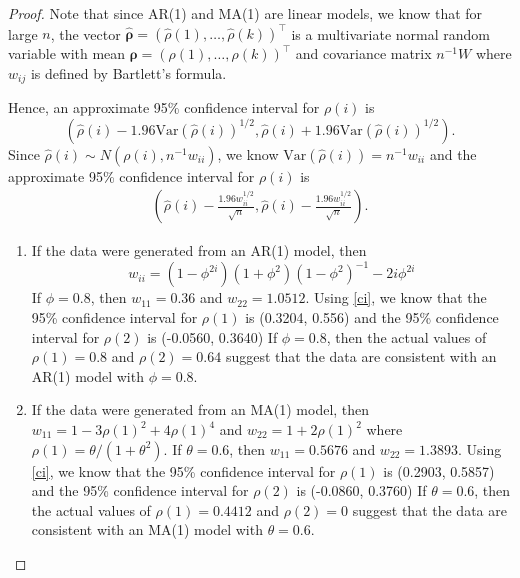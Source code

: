 \documentclass[12pt]{article}
\theoremstyle{definition}
\newcommand{\V}{\text{Var}}
\newcommand{\vect}[1]{\boldsymbol{#1}}
\begin{document}
\begin{proof}
  Note that since AR(1) and MA(1) are linear models, we know that for large $n$,
  the vector $\vect{\hat{\rho}} = (\hat{\rho}(1), \dots, \hat{\rho}(k))^\intercal$
  is a multivariate normal random variable with mean $\vect{\rho} = (\rho(1), \dots, \rho(k))^\intercal$
  and covariance matrix $n^{-1}W$ where $w_{ij}$ is defined by Bartlett's formula.

  Hence, an approximate 95\% confidence interval for
  $\rho(i)$ is
  \[
    \left(\hat{\rho}(i) - 1.96\V(\hat{\rho}(i))^{1/2}, \hat{\rho}(i) + 1.96\V(\hat{\rho}(i))^{1/2}\right).
  \]
  Since $\hat{\rho}(i) \sim N(\rho(i), n^{-1}w_{ii})$, we know $\V(\hat{\rho}(i)) = n^{-1}w_{ii}$ and the
  approximate 95\% confidence interval for $\rho(i)$ is
  \begin{align}\label{ci}
    \left(\hat{\rho}(i) - \frac{1.96w_{ii}^{1/2}}{\sqrt{n}}, \hat{\rho}(i) - \frac{1.96w_{ii}^{1/2}}{\sqrt{n}}\right).
  \end{align}
  \begin{enumerate}
    \item If the data were generated from an AR(1) model,
      then $$w_{ii} = (1 - \phi^{2i})(1 + \phi^2)(1 - \phi^2)^{-1} - 2i\phi^{2i}$$
      If $\phi = 0.8$, then $w_{11} = 0.36$ and $w_{22} = 1.0512$. Using \eqref{ci}, we know
      that the 95\% confidence interval for $\rho(1)$ is (0.3204, 0.556) and
      the 95\% confidence interval for $\rho(2)$ is (-0.0560, 0.3640)
      If $\phi = 0.8$, then the actual values of $\rho(1) = 0.8$ and $\rho(2) = 0.64$
      suggest that the data are consistent with an AR(1) model with
      $\phi = 0.8.$
    \item If the data were generated from an MA(1) model,
      then $w_{11} = 1 - 3 \rho(1)^2 + 4 \rho(1)^4$ and $w_{22} = 1 + 2 \rho(1)^2$ where $\rho(1) = \theta / (1 + \theta^2)$.
      If $\theta = 0.6$, then $w_{11} = 0.5676$ and $w_{22} = 1.3893$. Using \eqref{ci}, we know
      that the 95\% confidence interval for $\rho(1)$ is (0.2903, 0.5857) and
      the 95\% confidence interval for $\rho(2)$ is (-0.0860, 0.3760)
      If $\theta = 0.6$, then the actual values of $\rho(1) = 0.4412$ and $\rho(2) = 0$
      suggest that the data are consistent with an MA(1) model with
      $\theta = 0.6.$
  \end{enumerate}
\end{proof}
\end{document}
